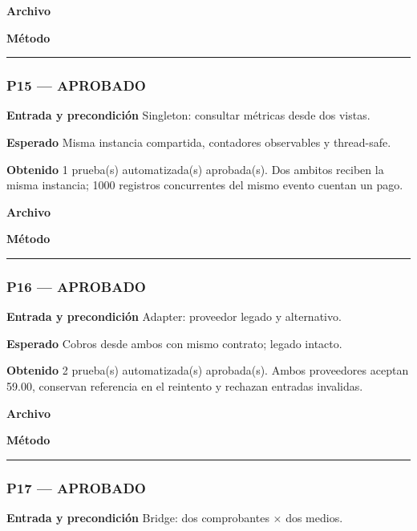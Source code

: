 \textbf{Archivo} \href{https://github.com/Alan77-bot/LogiMarket360Alan/blob/68bda51063441415524ede51bdf61649ee9b4973/tests/LogiMarket.Tests/Patrones/CreacionalesTests.cs}{}

\textbf{Método} 

\medskip\hrule\medskip
\subsubsection*{P15 --- APROBADO}
\textbf{Entrada y precondición} Singleton: consultar métricas desde dos vistas.

\textbf{Esperado} Misma instancia compartida, contadores observables y thread-safe.

\textbf{Obtenido} 1 prueba(s) automatizada(s) aprobada(s). Dos ambitos reciben la misma instancia; 1000 registros concurrentes del mismo evento cuentan un pago.

\textbf{Archivo} \href{https://github.com/Alan77-bot/LogiMarket360Alan/blob/68bda51063441415524ede51bdf61649ee9b4973/tests/LogiMarket.Tests/Patrones/CreacionalesTests.cs}{}

\textbf{Método} 

\medskip\hrule\medskip
\subsubsection*{P16 --- APROBADO}
\textbf{Entrada y precondición} Adapter: proveedor legado y alternativo.

\textbf{Esperado} Cobros desde ambos con mismo contrato; legado intacto.

\textbf{Obtenido} 2 prueba(s) automatizada(s) aprobada(s). Ambos proveedores aceptan 59.00, conservan referencia en el reintento y rechazan entradas invalidas.

\textbf{Archivo} \href{https://github.com/Alan77-bot/LogiMarket360Alan/blob/68bda51063441415524ede51bdf61649ee9b4973/tests/LogiMarket.Tests/Patrones/EstructuralesTests.cs}{}

\textbf{Método} 

\medskip\hrule\medskip
\subsubsection*{P17 --- APROBADO}
\textbf{Entrada y precondición} Bridge: dos comprobantes  $\times$  dos medios.

